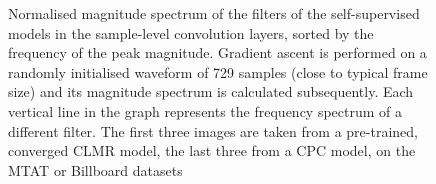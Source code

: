 \documentclass{report}
\begin{document}
\begin{figure}[t]
    \hfill
    \hfill
    \hfill
    \hfill
    \hfill

    \caption{Normalised magnitude spectrum of the filters of the self-supervised models in the sample-level convolution layers, sorted by the frequency of the peak magnitude. Gradient ascent is performed on a randomly initialised waveform of 729 samples (close to typical frame size) and its magnitude spectrum is calculated subsequently. Each vertical line in the graph represents the frequency spectrum of a different filter. The first three images are taken from a pre-trained, converged CLMR model, the last three from a CPC model, on the MTAT or Billboard datasets}
    \label{fig:filter_visualisation}
\end{figure}
\end{document}

